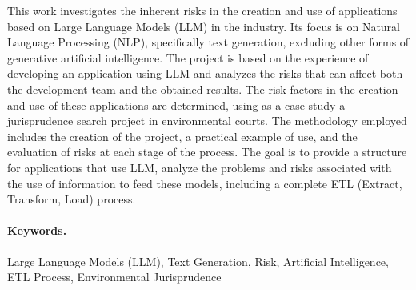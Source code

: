 

\vspace{20mm}
This work investigates the inherent risks in the creation and use of applications based on Large Language Models (LLM) in the industry. Its focus is on Natural Language Processing (NLP), specifically text generation, excluding other forms of generative artificial intelligence. The project is based on the experience of developing an application using LLM and analyzes the risks that can affect both the development team and the obtained results. The risk factors in the creation and use of these applications are determined, using as a case study a jurisprudence search project in environmental courts. The methodology employed includes the creation of the project, a practical example of use, and the evaluation of risks at each stage of the process. The goal is to provide a structure for applications that use LLM, analyze the problems and risks associated with the use of information to feed these models, including a complete ETL (Extract, Transform, Load) process.

\paragraph{Keywords.}
Large Language Models (LLM),
Text Generation,
Risk,
Artificial Intelligence,
ETL Process,
Environmental Jurisprudence

\vspace{20mm}


%
%
%
%
